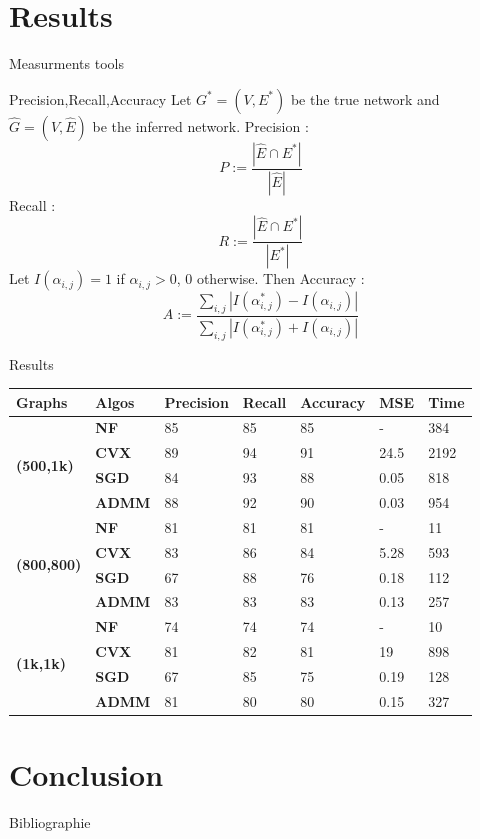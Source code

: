 \documentclass{beamer}
\begin{document}
\section{Results}
\begin{frame}{Measurments tools}
    \begin{block}{Precision,Recall,Accuracy}
    Let $G^*=(V,E^*)$ be the true network and $\hat{G} = (V, \hat{E})$ be the inferred network.
    Precision : \begin{equation*}
        P := \frac{|\hat{E}\cap E^*|}{|\hat{E}|}
    \end{equation*}
    Recall :\begin{equation*}
        R := \frac{|\hat{E} \cap E^*|}{|E^*|}
    \end{equation*}
    Let $I(\alpha_{i,j}) = 1$ if $\alpha_{i,j} > 0$, 0 otherwise. Then 
    Accuracy : \begin{equation*}
        A := \frac{\sum_{i,j}|I(\alpha^*_{i,j})-I(\hat{\alpha}_{i,j})|}{\sum_{i,j}|I(\alpha^*_{i,j})+I(\hat{\alpha}_{i,j})|}
    \end{equation*}
    \end{block}
\end{frame}
\begin{frame}{Results}
\begin{table}[scale = 0.5]
\begin{tabular}{|l|l|l|l|l|l|l|}
\hline
\textbf{Graphs} & \textbf{Algos} & \textbf{Precision} & \textbf{Recall} & \textbf{Accuracy} & \textbf{MSE} & \textbf{Time} \\ \hline
\multirow{4}{*}{\textbf{(500,1k)}} & \textbf{NF} & 85 & 85 & 85 & - & 384 \\ \cline{2-7} 
 & \textbf{CVX} & 89 & 94 & 91 & 24.5 & 2192 \\ \cline{2-7} 
 & \textbf{SGD} & 84 & 93 & 88 & 0.05 & 818 \\ \cline{2-7} 
 & \textbf{ADMM} & 88 & 92 & 90 & 0.03 & 954 \\ \hline
\multirow{4}{*}{\textbf{(800,800)}} & \textbf{NF} & 81 & 81 & 81 & - & 11 \\ \cline{2-7} 
 & \textbf{CVX} & 83 & 86 & 84 & 5.28 & 593 \\ \cline{2-7} 
 & \textbf{SGD} & 67 & 88 & 76 & 0.18 & 112 \\ \cline{2-7} 
 & \textbf{ADMM} & 83 & 83 & 83 & 0.13 & 257 \\ \hline
\multirow{4}{*}{\textbf{(1k,1k)}} & \textbf{NF} & 74 & 74 & 74 & - & 10 \\ \cline{2-7} 
 & \textbf{CVX} & 81 & 82 & 81 & 19 & 898 \\ \cline{2-7} 
 & \textbf{SGD} & 67 & 85 & 75 & 0.19 & 128 \\ \cline{2-7} 
 & \textbf{ADMM} & 81 & 80 & 80 & 0.15 & 327 \\ \hline
\end{tabular}
\end{table}
\end{frame}
\section{Conclusion}
\begin{frame}[allowframebreaks]{Bibliographie}
    
    
\end{frame}
\end{document}
